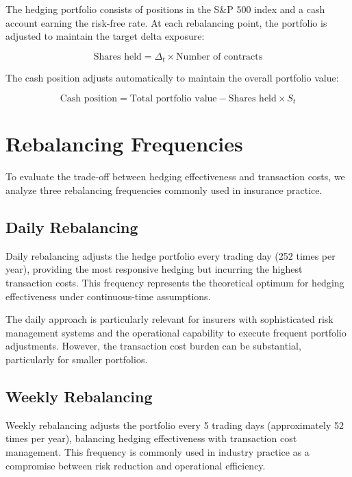 \documentclass[12pt,a4paper]{report}
\begin{document}
The hedging portfolio consists of positions in the S\&P 500 index and a cash account earning the risk-free rate. At each rebalancing point, the portfolio is adjusted to maintain the target delta exposure:

\begin{equation}
\text{Shares held} = \Delta_t \times \text{Number of contracts}
\end{equation}

The cash position adjusts automatically to maintain the overall portfolio value:

\begin{equation}
\text{Cash position} = \text{Total portfolio value} - \text{Shares held} \times S_t
\end{equation}

\section{Rebalancing Frequencies}

To evaluate the trade-off between hedging effectiveness and transaction costs, we analyze three rebalancing frequencies commonly used in insurance practice.

\subsection{Daily Rebalancing}

Daily rebalancing adjusts the hedge portfolio every trading day (252 times per year), providing the most responsive hedging but incurring the highest transaction costs. This frequency represents the theoretical optimum for hedging effectiveness under continuous-time assumptions.

The daily approach is particularly relevant for insurers with sophisticated risk management systems and the operational capability to execute frequent portfolio adjustments. However, the transaction cost burden can be substantial, particularly for smaller portfolios.

\subsection{Weekly Rebalancing}

Weekly rebalancing adjusts the portfolio every 5 trading days (approximately 52 times per year), balancing hedging effectiveness with transaction cost management. This frequency is commonly used in industry practice as a compromise between risk reduction and operational efficiency.
\end{document}
